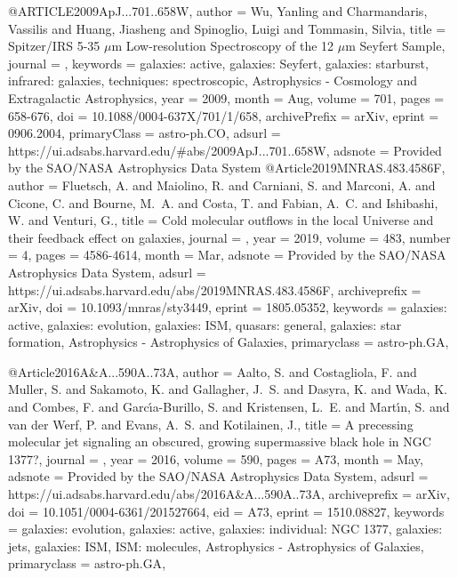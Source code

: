 \documentclass[longauth]{aa}
\begin{document}
{{{{@ARTICLE{2009ApJ...701..658W,
       author = {{Wu}, Yanling and {Charmandaris}, Vassilis and {Huang}, Jiasheng and {Spinoglio}, Luigi and {Tommasin}, Silvia},
        title = {Spitzer/IRS 5-35 {\ensuremath{\mu}}m Low-resolution Spectroscopy of the 12 {\ensuremath{\mu}}m Seyfert Sample},
      journal = {\apj},
     keywords = {galaxies: active, galaxies: Seyfert, galaxies: starburst, infrared: galaxies, techniques: spectroscopic, Astrophysics - Cosmology and Extragalactic Astrophysics},
         year = 2009,
        month = Aug,
       volume = {701},
        pages = {658-676},
          doi = {10.1088/0004-637X/701/1/658},
archivePrefix = {arXiv},
       eprint = {0906.2004},
 primaryClass = {astro-ph.CO},
       adsurl = {https://ui.adsabs.harvard.edu/#abs/2009ApJ...701..658W},
      adsnote = {Provided by the SAO/NASA Astrophysics Data System}
}
@Article{2019MNRAS.483.4586F,
  author        = {{Fluetsch}, A. and {Maiolino}, R. and {Carniani}, S. and {Marconi}, A. and {Cicone}, C. and {Bourne}, M.~A. and {Costa}, T. and {Fabian}, A.~C. and {Ishibashi}, W. and {Venturi}, G.},
  title         = {Cold molecular outflows in the local Universe and their feedback effect on galaxies},
  journal       = {\mnras},
  year          = {2019},
  volume        = {483},
  number        = {4},
  pages         = {4586-4614},
  month         = {Mar},
  adsnote       = {Provided by the SAO/NASA Astrophysics Data System},
  adsurl        = {https://ui.adsabs.harvard.edu/abs/2019MNRAS.483.4586F},
  archiveprefix = {arXiv},
  doi           = {10.1093/mnras/sty3449},
  eprint        = {1805.05352},
  keywords      = {galaxies: active, galaxies: evolution, galaxies: ISM, quasars: general, galaxies: star formation, Astrophysics - Astrophysics of Galaxies},
  primaryclass  = {astro-ph.GA},
}

@Article{2016A&A...590A..73A,
  author        = {{Aalto}, S. and {Costagliola}, F. and {Muller}, S. and {Sakamoto}, K. and {Gallagher}, J.~S. and {Dasyra}, K. and {Wada}, K. and {Combes}, F. and {Garc{\'\i}a-Burillo}, S. and {Kristensen}, L.~E. and {Mart{\'\i}n}, S. and {van der Werf}, P. and {Evans}, A.~S. and {Kotilainen}, J.},
  title         = {A precessing molecular jet signaling an obscured, growing supermassive black hole in NGC 1377?},
  journal       = {\aap},
  year          = {2016},
  volume        = {590},
  pages         = {A73},
  month         = {May},
  adsnote       = {Provided by the SAO/NASA Astrophysics Data System},
  adsurl        = {https://ui.adsabs.harvard.edu/abs/2016A&A...590A..73A},
  archiveprefix = {arXiv},
  doi           = {10.1051/0004-6361/201527664},
  eid           = {A73},
  eprint        = {1510.08827},
  keywords      = {galaxies: evolution, galaxies: active, galaxies: individual: NGC 1377, galaxies: jets, galaxies: ISM, ISM: molecules, Astrophysics - Astrophysics of Galaxies},
  primaryclass  = {astro-ph.GA},
}

}}}}
\end{document}
